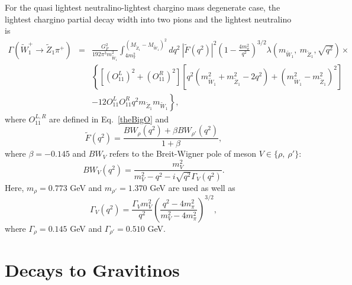 \documentclass[final,3p,times]{elsarticle}
\begin{document}
For the quasi lightest neutralino-lightest chargino mass degenerate case, 
the lightest chargino partial decay width into two pions and the lightest
neutralino 
is~\cite{gunionetal} 
\begin{eqnarray}
\Gamma( {\tilde W}_1^+ \rightarrow {\tilde Z}_1 \pi^+) &=& 
\frac{G_F^2}{192 \pi^3 m_{{\tilde W}_1}^2} \int_{4 m_\pi^2}^{(M_{\tilde{Z}_1}-M_{\tilde{W}_1})^2}
dq^2\ \left| \tilde{F}(q^2)\right|^2 \left(1 - \frac{4 m_\pi^2}{q^2} \right)^{3/2}
\lambda\left(m_{\tilde{W}_1},\ m_{\tilde{Z}_1}, \sqrt{q^2}\right) \times \nonumber \\&&
\left\{ \left[ (O^L_{11})^2 +(O^R_{11})^2\right] 
\left[ q^2(m_{{\tilde W}_1}^2 + m_{{\tilde Z}_1}^2-2q^2) +
(m_{{\tilde W}_1}^2 - m_{{\tilde Z}_1}^2)^2 \right] \right. \nonumber \\
&&\left. -12 O^L_{11} O^R_{11} q^2 m_{\tilde{Z}_1}m_{\tilde{W}_1}
\right\}, \label{chpipineut}
\end{eqnarray}
where $O^{L,R}_{11}$ are defined in Eq.~\ref{theBigO} and
\begin{equation}
\tilde{F}(q^2)=\frac{BW_\rho(q^2) + \beta BW_{\rho'}(q^2)}{1+\beta},
\end{equation}
where $\beta=-0.145$ and
$BW_V$ refers to the Breit-Wigner pole of meson $V \in \{ \rho,\ \rho' \}$:
\begin{equation}
BW_V(q^2) = \frac{m_V^2}{m_V^2 - q^2 - i \sqrt{q^2} \Gamma_V(q^2)}.
\end{equation}
Here, $m_\rho=0.773$ GeV and $m_{\rho'}=1.370$ GeV are used as well as
\begin{equation}
\Gamma_V(q^2) = \frac{\Gamma_V m_V^2}{q^2} 
\left( \frac{q^2 - 4m_\pi^2}{m_V^2 - 4 m_\pi^2}
\right)^{3/2},
\end{equation}
where $\Gamma_\rho=0.145$ GeV and
$\Gamma_{\rho'}=0.510$ GeV.
\section{Decays to Gravitinos} \label{appendix:gravitinos}
\end{document}
